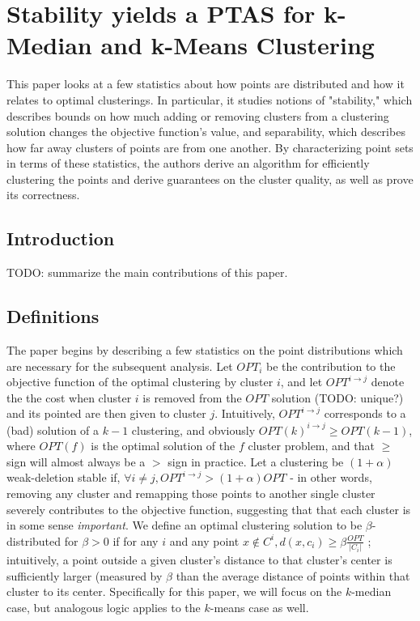 \documentclass[paper=a4, fontsize=11pt]{scrartcl} %
\numberwithin{equation}{section} %
\numberwithin{figure}{section} %
\numberwithin{table}{section} %
\begin{document}
\section{Stability yields a PTAS for k-Median and k-Means Clustering}

This paper looks at a few statistics about how points are distributed and how it relates to optimal clusterings.  In particular, it studies notions of "stability," which describes bounds on how much adding or removing clusters from a clustering solution changes the objective function's value, and separability, which describes how far away clusters of points are from one another.  By characterizing point sets in terms of these statistics, the authors derive an algorithm for efficiently clustering the points and derive guarantees on the cluster quality, as well as prove its correctness.

\subsection{Introduction}
TODO: summarize the main contributions of this paper.

\subsection{Definitions}
The paper begins by describing a few statistics on the point distributions which are necessary for the subsequent analysis.  Let $OPT_i$ be the contribution to the objective function of the optimal clustering by cluster $i$, and let $OPT^{i \rightarrow j}$ denote the the cost when cluster $i$ is removed from the $OPT$ solution (TODO: unique?) and its pointed are then given to cluster $j$.  Intuitively, $OPT^{i \rightarrow j}$ corresponds to a (bad) solution of a $k-1$ clustering, and obviously $OPT(k)^{i \rightarrow j} \geq OPT(k-1)$, where $OPT(f)$ is the optimal solution of the $f$ cluster problem, and that $\geq$ sign will almost always be a $>$ sign in practice.  Let a clustering be $(1 + \alpha)$ weak-deletion stable if, $\forall i \neq j, OPT^{i \rightarrow j} > (1 + \alpha)OPT$ - in other words, removing any cluster and remapping those points to another single cluster severely contributes to the objective function, suggesting that that each cluster is in some sense \emph{important}.  We define an optimal clustering solution to be $\beta$-distributed for $\beta > 0$ if for any $i$ and any point $x \notin C^i, d(x, c_i) \geq \beta \frac{OPT}{|C_i|}$ ; intuitively, a point outside a given cluster's distance to that cluster's center is sufficiently larger (measured by $\beta$ than the average distance of points within that cluster to its center.  Specifically for this paper, we will focus on the $k$-median case, but analogous logic applies to the $k$-means case as well.   
\end{document}
